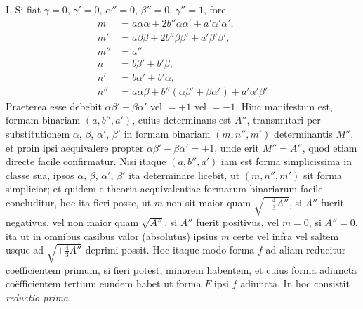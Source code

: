 I. Si fiat \(\gamma=0\), \(\gamma'=0\), \(\alpha''=0\), \(\beta''=0\), \(\gamma''=1\), fore
\[
\begin{aligned}
m&=a\alpha\alpha+2b''\alpha\alpha'+a'\alpha'\alpha',\\
m'&=a\beta\beta+2b''\beta\beta'+a'\beta'\beta',\\
m''&=a''\\
n&=b\beta'+b'\beta,\\
n'&=b\alpha'+b'\alpha,\\
n''&=a\alpha\beta+b''(\alpha\beta'+\beta\alpha')+a'\alpha'\beta'
\end{aligned}
\]
Praeterea esse debebit \(\alpha\beta'-\beta\alpha'\) vel \(=+1\) vel \(=-1\). Hinc manifestum est, formam binariam \((a,b'',a')\), cuius determinans est \(A''\), transmutari per substitutionem \(\alpha\), \(\beta\), \(\alpha'\), \(\beta'\) in formam binariam \((m,n'',m')\) determinantis \(M''\), et proin ipsi aequivalere propter \(\alpha\beta'-\beta\alpha'=\pm1\), unde erit \(M''=A''\), quod etiam directe facile confirmatur. Nisi itaque \((a,b'',a')\) iam est forma simplicissima in classe sua, ipsos \(\alpha\), \(\beta\), \(\alpha'\), \(\beta'\) ita determinare licebit, ut \((m,n'',m')\) sit forma simplicior; et quidem e theoria aequivalentiae formarum binariarum facile concluditur, hoc ita fieri posse, ut \(m\) non sit maior quam \(\sqrt{-\frac{4}{3}A''}\), si \(A''\) fuerit negativus, vel non maior quam \(\sqrt{A''}\), si \(A''\) fuerit positivus, vel \(m=0\), si \(A''=0\), ita ut in omnibus casibus valor (absolutus) ipsius \(m\) certe vel infra vel saltem usque ad \(\sqrt{\pm\frac{4}{3}A''}\) deprimi possit. Hoc itaque modo forma \(f\) ad aliam reducitur co\"efficientem primum, si fieri potest, minorem habentem, et cuius forma adiuncta co\"efficientem tertium eundem habet ut forma \(F\) ipsi \(f\) adiuncta. In hoc consistit \emph{reductio prima}.

